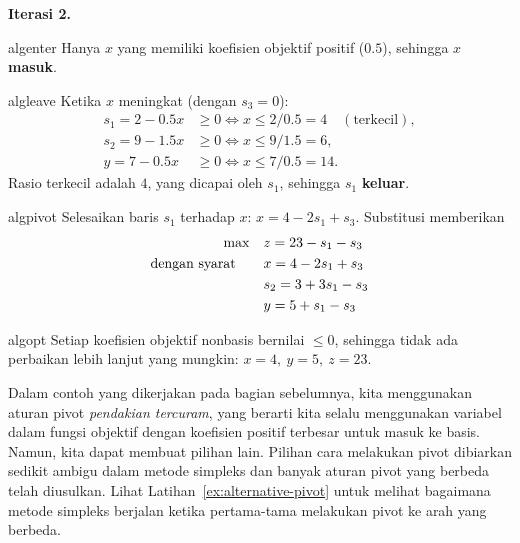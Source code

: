 \noindent\textbf{Iterasi 2.}
\begin{steppanel}{algenter}
 Hanya \(x\) yang memiliki koefisien objektif positif (\(0.5\)), sehingga \(x\) \textbf{masuk}.
\end{steppanel}
\begin{steppanel}{algleave}
 Ketika \(x\) meningkat (dengan \(s_3=0\)):
\[
\begin{aligned}
s_1 = 2 - 0.5x &\ge 0 \iff x \le 2/0.5 = 4 \quad(\text{terkecil}),\\
s_2 = 9 - 1.5x &\ge 0 \iff x \le 9/1.5 = 6,\\
y   = 7 - 0.5x &\ge 0 \iff x \le 7/0.5 = 14.
\end{aligned}
\]
Rasio terkecil adalah \(4\), yang dicapai oleh \(s_1\), sehingga \(s_1\) \textbf{keluar}.
\end{steppanel}
\begin{steppanel}{algpivot}
 Selesaikan baris \(s_1\) terhadap \(x\): \(x = 4 - 2s_1 + s_3\). Substitusi memberikan
\[
\begin{aligned}
\max\quad & z = 23 - s_1 - s_3 \\
\mbox{dengan syarat}\quad\quad  & x = 4 - 2s_1 + s_3 \\
          & s_2 = 3 + 3s_1 - s_3 \\
          & y = 5 + s_1 - s_3
\end{aligned}
\]
\end{steppanel}
\begin{steppanel}{algopt}
 Setiap koefisien objektif nonbasis bernilai \(\le 0\), sehingga tidak ada perbaikan lebih lanjut yang mungkin: \(x=4,\ y=5,\ z=23\).
\end{steppanel}
%
%

Dalam contoh yang dikerjakan pada bagian sebelumnya, kita menggunakan aturan pivot \emph{pendakian tercuram}, yang berarti kita selalu menggunakan variabel dalam fungsi objektif dengan koefisien positif terbesar untuk masuk ke basis. Namun, kita dapat membuat pilihan lain. Pilihan cara melakukan pivot dibiarkan sedikit ambigu dalam metode simpleks dan banyak aturan pivot yang berbeda telah diusulkan.
Lihat Latihan~\ref{ex:alternative-pivot} untuk melihat bagaimana metode simpleks berjalan ketika pertama-tama melakukan pivot ke arah yang berbeda.  

